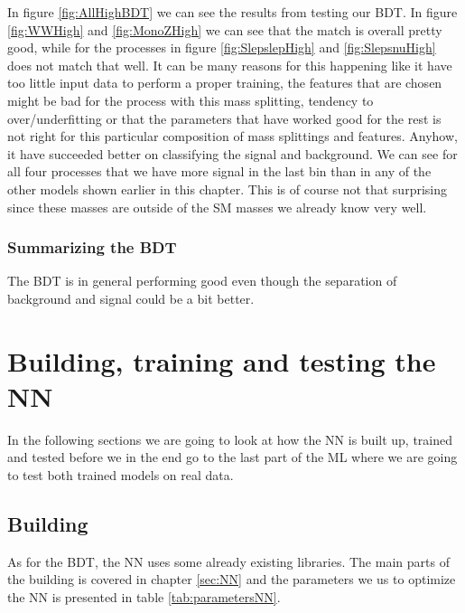 In figure \ref{fig:AllHighBDT} we can see the results from testing our BDT. In figure \ref{fig:WWHigh} and \ref{fig:MonoZHigh} we can see that the match is overall pretty good, while for the processes in figure \ref{fig:SlepslepHigh} and \ref{fig:SlepsnuHigh} does not match that well. It can be many reasons for this happening like it have too little input data to perform a proper training, the features that are chosen might be bad for the process with this mass splitting, tendency to over/underfitting or that the parameters that have worked good for the rest is not right for this particular composition of mass splittings and features. Anyhow, it have succeeded better on classifying the signal and background. We can see for all four processes that we have more signal in the last bin than in any of the other models shown earlier in this chapter. This is of course not that surprising since these masses are outside of the SM masses we already know very well.



\subsubsection{Summarizing the BDT}
The BDT is in general performing good even though the separation of background and signal could be a bit better. 




\section{Building, training and testing the NN}
In the following sections we are going to look at how the NN is built up, trained and tested before we in the end go to the last part of the ML where we are going to test both trained models on real data.

\subsection{Building}
As for the BDT, the NN uses some already existing libraries. The main parts of the building is covered in chapter \ref{sec:NN} and the parameters we us to optimize the NN is presented in table \ref{tab:parametersNN}.


